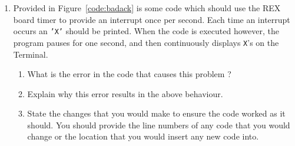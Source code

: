 \documentclass[a4paper,10pt]{article}
\begin{document}
\begin{enumerate}
\newpage
\item Provided in Figure~\ref{code:badack} is some code which should
use the REX board timer to provide an interrupt once per second. Each
time an interrupt occurs an \texttt{'X'} should be printed. When the code is
executed however, the program pauses for one second, and then
continuously displays \texttt{X}'s on the Terminal.

\label{ques:badack}

\begin{enumerate}
\item What is the error in the code that causes this problem ?

\item Explain why this error results in the above behaviour.

\item State the changes that you would make to ensure the code worked
as it should. You should provide the line numbers of any code that you
would change or the location that you would insert any new code into.

\end{enumerate}


\end{enumerate}
\end{document}
